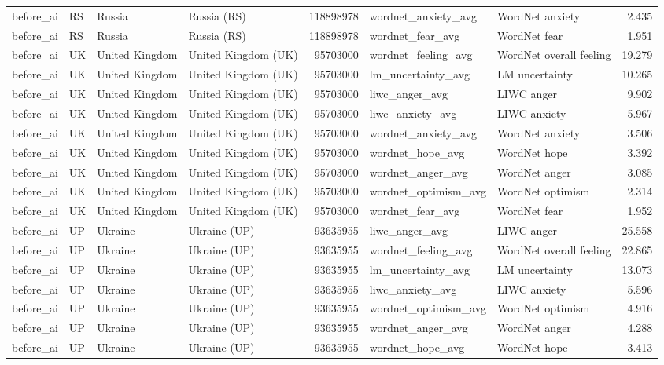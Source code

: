 \begin{tabular}{llllrllr}
before\_ai & RS & Russia & Russia (RS) & 118898978 & wordnet\_anxiety\_avg & WordNet anxiety & 2.435 \\
before\_ai & RS & Russia & Russia (RS) & 118898978 & wordnet\_fear\_avg & WordNet fear & 1.951 \\
before\_ai & UK & United Kingdom & United Kingdom (UK) & 95703000 & wordnet\_feeling\_avg & WordNet overall feeling & 19.279 \\
before\_ai & UK & United Kingdom & United Kingdom (UK) & 95703000 & lm\_uncertainty\_avg & LM uncertainty & 10.265 \\
before\_ai & UK & United Kingdom & United Kingdom (UK) & 95703000 & liwc\_anger\_avg & LIWC anger & 9.902 \\
before\_ai & UK & United Kingdom & United Kingdom (UK) & 95703000 & liwc\_anxiety\_avg & LIWC anxiety & 5.967 \\
before\_ai & UK & United Kingdom & United Kingdom (UK) & 95703000 & wordnet\_anxiety\_avg & WordNet anxiety & 3.506 \\
before\_ai & UK & United Kingdom & United Kingdom (UK) & 95703000 & wordnet\_hope\_avg & WordNet hope & 3.392 \\
before\_ai & UK & United Kingdom & United Kingdom (UK) & 95703000 & wordnet\_anger\_avg & WordNet anger & 3.085 \\
before\_ai & UK & United Kingdom & United Kingdom (UK) & 95703000 & wordnet\_optimism\_avg & WordNet optimism & 2.314 \\
before\_ai & UK & United Kingdom & United Kingdom (UK) & 95703000 & wordnet\_fear\_avg & WordNet fear & 1.952 \\
before\_ai & UP & Ukraine & Ukraine (UP) & 93635955 & liwc\_anger\_avg & LIWC anger & 25.558 \\
before\_ai & UP & Ukraine & Ukraine (UP) & 93635955 & wordnet\_feeling\_avg & WordNet overall feeling & 22.865 \\
before\_ai & UP & Ukraine & Ukraine (UP) & 93635955 & lm\_uncertainty\_avg & LM uncertainty & 13.073 \\
before\_ai & UP & Ukraine & Ukraine (UP) & 93635955 & liwc\_anxiety\_avg & LIWC anxiety & 5.596 \\
before\_ai & UP & Ukraine & Ukraine (UP) & 93635955 & wordnet\_optimism\_avg & WordNet optimism & 4.916 \\
before\_ai & UP & Ukraine & Ukraine (UP) & 93635955 & wordnet\_anger\_avg & WordNet anger & 4.288 \\
before\_ai & UP & Ukraine & Ukraine (UP) & 93635955 & wordnet\_hope\_avg & WordNet hope & 3.413 \\

\end{tabular}
